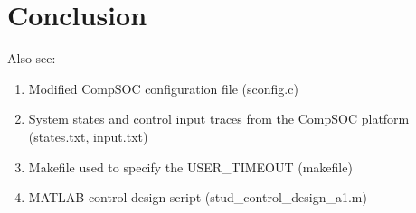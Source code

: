 \section{Conclusion}

Also see:
\begin{enumerate}
	\item Modified	CompSOC configuration	file	(sconfig.c)
	\item System	states	and	control	input	traces	from	the	CompSOC platform	(states.txt,	
	input.txt)
	\item Makefile used	to	specify	the	USER_TIMEOUT	(makefile)
	\item MATLAB	control	design	script	(stud_control_design_a1.m)
\end{enumerate}
